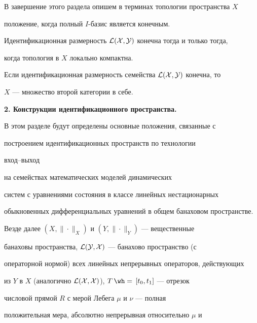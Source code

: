  


В завершение этого раздела опишем в терминах топологии пространства $X$ 


положение, когда полный $I$-базис является конечным. 


 


\begin{thm} 


Идентификационная размерность $\cal L(X,Y)$ конечна тогда и только тогда, 


когда топология в $X$ локально компактна. 


\end{thm} 


 


\begin{cor} 


Если идентификационная размерность семейства $\cal L(X,Y)$ конечна, то 


$X$ --- множество второй категории в себе. 


\end{cor} 


 


{\bf 2. Конструкции идентификационного пространства.} 


В этом разделе будут определены основные положения, связанные с 


построением идентификационных пространств по технологии {\it 


вход--выход} \cite{1} на семействах математических моделей динамических 


систем с уравнениями состояния в классе линейных нестационарных 


обыкновенных дифференциальных уравнений в общем банаховом пространстве. 


 


Везде далее $(X,\|\cdot\|_X)$ и $(Y,\|\cdot\|_Y)$ --- вещественные 


банаховы пространства, $\cal L(Y,X)$ --- банахово пространство (с 


операторной нормой) всех линейных непрерывных операторов, действующих 


из $Y$ в $X$ (аналогично $\cal L(X,X)$), $T\hateq[t_0,t_1]$ --- отрезок 


числовой прямой $R$ с мерой Лебега $\mu$ и $\nu$ --- полная 


положительная мера, абсолютно непрерывная относительно $\mu$ и 


